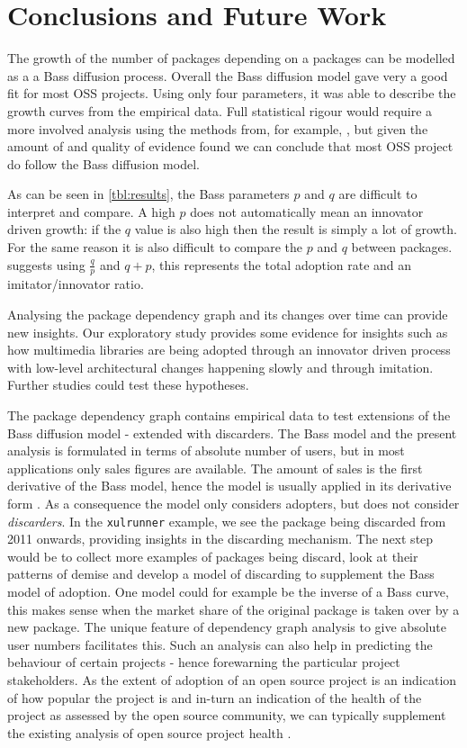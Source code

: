 \documentclass[smallextended,final]{svjour3}
\begin{document}
\section{Conclusions and Future Work}

The growth of the number of packages depending on a packages can be modelled as a a Bass diffusion process. Overall the Bass diffusion model gave very a good fit for most OSS projects. Using only four parameters, it was able to describe the growth curves from the empirical data. Full statistical rigour would require a more involved analysis using the methods from, for example, \citet{carlos06}, but given the amount of and quality of evidence found we can conclude that most OSS project do follow the Bass diffusion model.

As can be seen in \ref{tbl:results}, the Bass parameters $p$ and $q$ are difficult to interpret and compare. A high $p$ does not automatically mean an innovator driven growth: if the $q$ value is also high then the result is simply a lot of growth. For the same reason it is also difficult to compare the $p$ and $q$ between packages. \citet{mahajan95} suggests using $\frac{q}{p}$ and $q + p$, this represents the total adoption rate and an imitator/innovator ratio.

Analysing the package dependency graph and its changes over time can provide new insights. Our exploratory study provides some evidence for insights such as how multimedia libraries are being adopted through an innovator driven process with low-level architectural changes happening slowly and through imitation. Further studies could test these hypotheses.

The package dependency graph contains empirical data to test extensions of the Bass diffusion model - extended with discarders. The Bass model and the present analysis is formulated in terms of absolute number of users, but in most applications only sales figures are available. The amount of sales is the first derivative of the Bass model, hence the model is usually applied in its derivative form \citep{mahajan95}. As a consequence the model only considers adopters, but does not consider \emph{discarders}. In the \texttt{xulrunner} example, we see the package being discarded from 2011 onwards, providing insights in the discarding mechanism. The next step would be to collect more examples of packages being discard, look at their patterns of demise and develop a model of discarding to supplement the Bass model of adoption. One model could for example be the inverse of a Bass curve, this makes sense when the market share of the original package is taken over by a new package. The unique feature of dependency graph analysis to give absolute user numbers facilitates this. Such an analysis can also help in predicting the behaviour of certain projects - hence forewarning the particular project stakeholders. As the extent of adoption of an open source project is an indication of how popular the project is and in-turn an indication of the health of the project as assessed by the open source community, we can typically supplement the existing analysis of open source project health \citep{daniel13,amrit10a,piggot13}.
\end{document}
